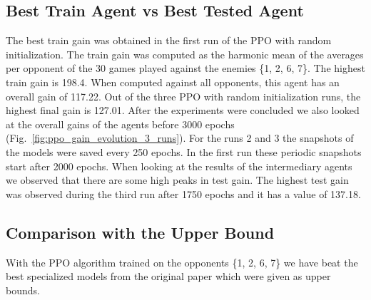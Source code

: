 \documentclass[conference]{IEEEtran}
\begin{document}
    \subsection{Best Train Agent vs Best Tested Agent}\label{subsec:best-tested-agent}
    The best train gain was obtained in the first run of the PPO with random initialization.
    The train gain was computed as the harmonic mean of the averages per opponent of the 30 games played against
    the enemies \{1, 2, 6, 7\}.
    The highest train gain is 198.4.
    When computed against all opponents, this agent has an overall gain of 117.22.
    Out of the three PPO with random initialization runs, the highest final gain is 127.01.
    After the experiments were concluded we also looked at the overall gains of the agents before 3000 epochs (Fig.~\ref{fig:ppo_gain_evolution_3_runs}).
    For the runs 2 and 3 the snapshots of the models were saved every 250 epochs.
    In the first run these periodic snapshots start after 2000 epochs.
    When looking at the results of the intermediary agents we observed that there are some high peaks in test gain.
    The highest test gain was observed during the third run after 1750 epochs and it has a value of 137.18.


    \subsection{Comparison with the Upper Bound}\label{subsec:comparison-with-the-upper-bound}
    With the PPO algorithm trained on the opponents \{1, 2, 6, 7\} we have
    beat the best specialized models from the original paper which were given as upper bounds\cite{evoman}.
\end{document}
